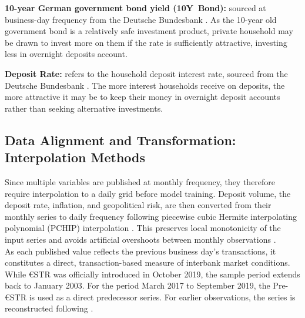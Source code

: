 \documentclass[11pt,a4paper]{article}
\begin{document}
 
\textbf{10-year German government bond yield ({10Y~Bond}):} 
sourced at business-day frequency from the Deutsche Bundesbank
\citep{bundesbank_bonds}. As the 10-year old government bond is a relatively safe investment product, private household may be drawn to invest more on them if the rate is sufficiently attractive, investing less in overnight deposits account. 

\textbf{Deposit Rate:} refers to the household deposit interest
rate, sourced from the Deutsche Bundesbank \citep{bundesbank_data}.
The more interest households receive on deposits, the more
attractive it may be to keep their money in overnight deposit
accounts rather than seeking alternative investments.



\subsection{Data Alignment and Transformation: Interpolation Methods}

Since multiple variables are published at monthly frequency, they therefore require interpolation to a daily grid before model training. 
Deposit volume, the deposit rate, inflation, and geopolitical risk, are then converted from their monthly series to daily
frequency following piecewise cubic Hermite interpolating polynomial (PCHIP) interpolation \citet[Ch.~5.2]{winkler2025}.
This preserves local monotonicity of the input series and avoids artificial overshoots between monthly observations \citep{fritsch_carlson}. \\
\indent As each published value reflects the previous business day's
transactions, it constitutes a direct, transaction-based measure
of interbank market conditions. While $\text{€STR}$ was
officially introduced in October 2019, the sample period extends
back to January 2003. For the period March 2017 to September
2019, the Pre-$\text{€STR}$ \citep{ecb_preestr} is used as a
direct predecessor series. For earlier observations, the series
is reconstructed following \citet[Ch.~5.2]{winkler2025}.
\end{document}
